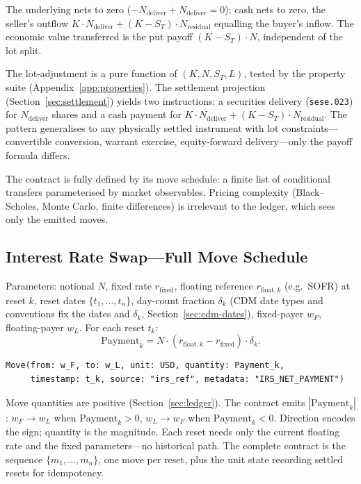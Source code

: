\begin{proposition}
The underlying nets to zero ($-N_{\text{deliver}} + N_{\text{deliver}} = 0$); cash nets to zero, the seller's outflow $K\cdot N_{\text{deliver}} + (K-S_T)\cdot N_{\text{residual}}$ equalling the buyer's inflow. The economic value transferred is the put payoff $(K-S_T)\cdot N$, independent of the lot split.
\end{proposition}

\noindent The lot-adjustment is a pure function of $(K, N, S_T, L)$, tested by the property suite (Appendix~\ref{app:properties}). The settlement projection (Section~\ref{sec:settlement}) yields two instructions: a securities delivery (\texttt{sese.023}) for $N_{\text{deliver}}$ shares and a cash payment for $K\cdot N_{\text{deliver}} + (K-S_T)\cdot N_{\text{residual}}$. The pattern generalises to any physically settled instrument with lot constraints---convertible conversion, warrant exercise, equity-forward delivery---only the payoff formula differs.

The contract is fully defined by its move schedule: a finite list of conditional transfers parameterised by market observables. Pricing complexity (Black--Scholes, Monte Carlo, finite differences) is irrelevant to the ledger, which sees only the emitted moves.

\subsection{Interest Rate Swap---Full Move Schedule}

\noindent Parameters: notional $N$, fixed rate $r_{\text{fixed}}$, floating reference $r_{\text{float},k}$ (e.g.\ SOFR) at reset $k$, reset dates $\{t_1,\ldots,t_n\}$, day-count fraction $\delta_k$ (CDM date types and conventions fix the dates and $\delta_k$, Section~\ref{sec:cdm-dates}), fixed-payer $w_F$, floating-payer $w_L$. For each reset $t_k$:
\[
\text{Payment}_k = N \cdot (r_{\text{float},k} - r_{\text{fixed}}) \cdot \delta_k .
\]

\begin{lstlisting}
Move(from: w_F, to: w_L, unit: USD, quantity: Payment_k,
     timestamp: t_k, source: "irs_ref", metadata: "IRS_NET_PAYMENT")
\end{lstlisting}

\noindent Move quantities are positive (Section~\ref{sec:ledger}). The contract emits $|\text{Payment}_k|$: $w_F \to w_L$ when $\text{Payment}_k > 0$, $w_L \to w_F$ when $\text{Payment}_k < 0$. Direction encodes the sign; quantity is the magnitude. Each reset needs only the current floating rate and the fixed parameters---no historical path. The complete contract is the sequence $\{m_1,\ldots,m_n\}$, one move per reset, plus the unit state recording settled resets for idempotency.

